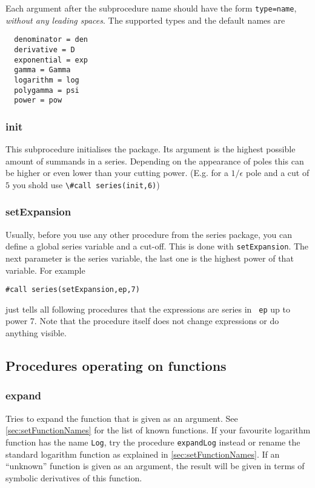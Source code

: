 \documentclass[titlepage]{article}
\begin{document}
Each argument after the subprocedure name should have the form
\lstinline!type=name!, \emph{without any leading spaces}. The
supported types and the default names are

\begin{lstlisting}
  denominator = den
  derivative = D
  exponential = exp
  gamma = Gamma
  logarithm = log
  polygamma = psi
  power = pow
\end{lstlisting}

\subsubsection{init}
\label{sec:init}

This subprocedure initialises the package. Its argument is the highest possible amount of
summands in a series. Depending on the appearance of poles this can be
higher or even lower than your cutting power. (E.g. for a $1/\epsilon$
pole and a cut of $5$ you shold use \lstinline!\#call series(init,6)!)

\subsubsection{setExpansion}
\label{sec:setExpansion}

Usually, before you use any other procedure from the series package, you can
define a global series variable and a cut-off. This is done with \lstinline!setExpansion!. The next parameter is the series variable, the
last one is the highest power of that variable. For example
\begin{lstlisting}
#call series(setExpansion,ep,7)
\end{lstlisting}
just tells all following procedures that the expressions are series in {\tt
  ep} up to power 7. Note that the procedure itself does
not change expressions or do anything visible.

\subsection{Procedures operating on functions}
\label{sec:proc_fun}

\subsubsection{expand}
\label{sec:expand}

Tries to expand the function that is given as an argument. See
\ref{sec:setFunctionNames} for the list of known functions. If your
favourite logarithm function has the name {\tt Log}, try the procedure
{\tt expandLog} instead or rename the standard logarithm function as
explained in \ref{sec:setFunctionNames}. If an ``unknown'' function is
given as an argument, the result will be given in terms of symbolic
derivatives of this function.
\end{document}
